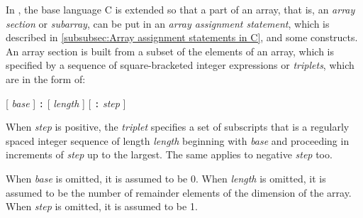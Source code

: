 





In {\XMPC}, the base language C is extended so that a part of an array,
that is, an {\it array section} or {\it subarray}, can be put in an {\it
array assignment statement}, which is described in \ref{subsubsec:Array
assignment statements in C}, and some {\XMP} constructs.
%
An array section is built from a subset of the elements of an array,
which is specified by a sequence of square-bracketed integer expressions
or {\it triplets}, which are in the form of:

\begin{center}
  [ {\it base} ] {\tt :} [ {\it length} ] [ {\tt :} {\it step} ]
\end{center}

When {\it step} is positive, the {\it triplet} specifies a set of
subscripts that is a regularly spaced integer sequence of length {\it
length} beginning with {\it base} and proceeding in increments of {\it
step} up to the largest.
%
The same applies to negative {\it step} too.

When {\it base} is omitted, it is assumed to be 0. When {\it length}
is omitted, it is assumed to be the number of remainder elements of the
dimension of the array. When {\it step} is omitted, it is assumed to be 1.


